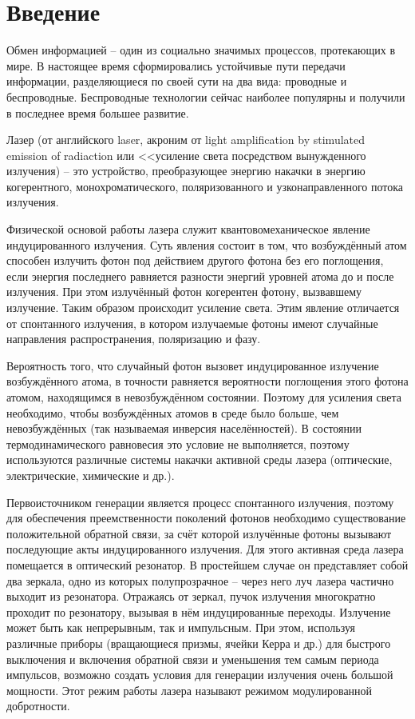 \documentclass[14pt,pscyr,titlepage]{hedreport}
\begin{document}
	\maketitle
	\tableofcontents
	\onehalfspacing
	\section{Введение}
		Обмен информацией -- один из социально значимых процессов, протекающих 
		в мире. В настоящее время сформировались устойчивые пути передачи 
		информации, разделяющиеся по своей сути на два вида: проводные и 
		беспроводные. Беспроводные технологии сейчас наиболее популярны и 
		получили в последнее время большее развитие. 

		Лазер (от английского laser, акроним от light amplification by 
		stimulated emission of radiaction или <<усиление света 
		посредством вынужденного излучения) -- это устройство, 
		преобразующее энергию накачки в энергию когерентного, 
		монохроматического, поляризованного и узконаправленного потока 
		излучения.

		Физической основой работы лазера служит квантовомеханическое явление 
		индуцированного излучения. Суть явления состоит в том, что 
		возбуждённый атом способен излучить фотон под действием другого фотона 
		без его поглощения, если энергия последнего равняется разности энергий 
		уровней атома до и после излучения. При этом излучённый фотон 
		когерентен фотону, вызвавшему излучение. Таким образом происходит 
		усиление света. Этим явление отличается от спонтанного излучения, в 
		котором излучаемые фотоны имеют случайные направления распространения, 
		поляризацию и фазу. 

		Вероятность того, что случайный фотон вызовет индуцированное излучение 
		возбуждённого атома, в точности равняется вероятности поглощения этого 
		фотона атомом, находящимся в невозбуждённом состоянии. Поэтому для 
		усиления света необходимо, чтобы возбуждённых атомов в среде было 
		больше, чем невозбуждённых (так называемая инверсия населённостей). 
		В состоянии термодинамического равновесия это условие не выполняется, 
		поэтому используются различные системы накачки активной среды лазера 
		(оптические, электрические, химические и др.).

		Первоисточником генерации является процесс спонтанного излучения, 
		поэтому для обеспечения преемственности поколений фотонов необходимо 
		существование положительной обратной связи, за счёт которой излучённые 
		фотоны вызывают последующие акты индуцированного излучения. Для этого 
		активная среда лазера помещается в оптический резонатор. В простейшем 
		случае он представляет собой два зеркала, одно из которых 
		полупрозрачное -- через него луч лазера частично выходит из 
		резонатора. Отражаясь от зеркал, пучок излучения многократно проходит 
		по резонатору, вызывая в нём индуцированные переходы. Излучение может 
		быть как непрерывным, так и импульсным. При этом, используя различные 
		приборы (вращающиеся призмы, ячейки Керра и др.) для быстрого 
		выключения и включения обратной связи и уменьшения тем самым периода 
		импульсов, возможно создать условия для генерации излучения очень 
		большой мощности. Этот режим работы лазера называют режимом 
		модулированной добротности.
\end{document}
